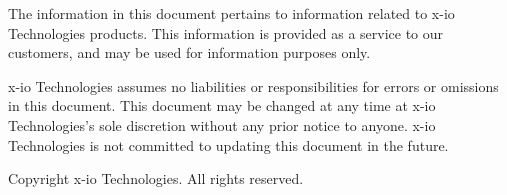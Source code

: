 
The information in this document pertains to information related to x-io Technologies products.  This information is provided as a service to our customers, and may be used for information purposes only.

x-io Technologies assumes no liabilities or responsibilities for errors or omissions in this document.  This document may be changed at any time at x-io Technologies’s sole discretion without any prior notice to anyone.  x-io Technologies is not committed to updating this document in the future.

Copyright \textcopyright{} \the\year{} x-io Technologies.  All rights reserved.
